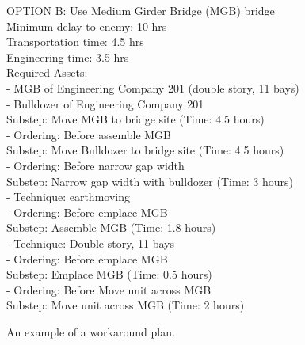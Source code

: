 \begin{figure}[tb]
\begin{scriptsize} %
\begin{center}
\begin{minipage}{3in}
OPTION B: Use Medium Girder Bridge (MGB) bridge \\
Minimum delay to enemy: 10 hrs\\
Transportation time: 4.5 hrs\\
Engineering time: 3.5 hrs\\
Required Assets:\\
\hspace*{0.3in}  	- MGB of Engineering Company 201 (double story, 11 bays)\\
\hspace*{0.3in} 	- Bulldozer of Engineering Company 201\\
Substep: Move MGB to bridge site (Time: 4.5 hours)\\
\hspace*{0.3in}  	- Ordering: Before assemble MGB\\
Substep: Move Bulldozer to bridge site (Time: 4.5 hours)\\
\hspace*{0.3in} 	- Ordering: Before narrow gap width\\
Substep: Narrow gap width with bulldozer (Time: 3 hours)\\
\hspace*{0.3in} 	- Technique: earthmoving \\
\hspace*{0.3in}	- Ordering: Before emplace MGB\\
Substep: Assemble MGB (Time: 1.8 hours)\\
\hspace*{0.3in}  	- Technique: Double story, 11 bays\\
\hspace*{0.3in} 	- Ordering: Before emplace MGB\\
Substep: Emplace MGB (Time: 0.5 hours)\\
\hspace*{0.3in}  	- Ordering: Before Move unit across MGB\\
Substep: Move unit across MGB (Time: 2 hours)\\
\end{minipage}
\end{center}
\end{scriptsize}
\caption{An example of a workaround plan.}
\label{workaround}
\end{figure}

